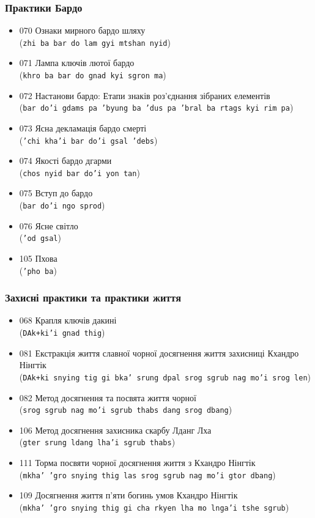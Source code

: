 \documentclass{article}
\begin{document}
\subsubsection{Практики Бардо}

\begingroup\raggedright
\begin{itemize}
\item 070 Ознаки мирного бардо шляху \\ (\texttt{zhi ba bar do lam gyi mtshan nyid})
\item 071 Лампа ключів лютої бардо \\ (\texttt{khro ba bar do gnad kyi sgron ma})
\item 072 Настанови бардо: Етапи знаків роз'єднання зібраних елементів \\ (\texttt{bar do'i gdams pa 'byung ba 'dus pa 'bral ba rtags kyi rim pa})
\item 073 Ясна декламація бардо смерті \\ (\texttt{'chi kha'i bar do'i gsal 'debs})
\item 074 Якості бардо дгарми \\ (\texttt{chos nyid bar do'i yon tan})
\item 075 Вступ до бардо \\ (\texttt{bar do'i ngo sprod})
\item 076 Ясне світло \\ (\texttt{'od gsal})
\item 105 Пхова \\ (\texttt{'pho ba})
\end{itemize}
\endgroup

\subsubsection{Захисні практики та практики життя}

\begingroup\raggedright
\begin{itemize}
\item 068 Крапля ключів дакині \\ (\texttt{DAk+ki'i gnad thig})
\item 081 Екстракція життя славної чорної досягнення життя захисниці Кхандро Нінгтік \\ (\texttt{DAk+ki snying tig gi bka' srung dpal srog sgrub nag mo'i srog len})
\item 082 Метод досягнення та посвята життя чорної \\ (\texttt{srog sgrub nag mo'i sgrub thabs dang srog dbang})
\item 106 Метод досягнення захисника скарбу Лданг Лха \\ (\texttt{gter srung ldang lha'i sgrub thabs})
\item 111 Торма посвяти чорної досягнення життя з Кхандро Нінгтік \\ (\texttt{mkha' 'gro snying thig las srog sgrub nag mo'i gtor dbang})
\item 109 Досягнення життя п'яти богинь умов Кхандро Нінгтік \\ (\texttt{mkha' 'gro snying thig gi cha rkyen lha mo lnga'i tshe sgrub})
\end{itemize}
\endgroup
\end{document}
